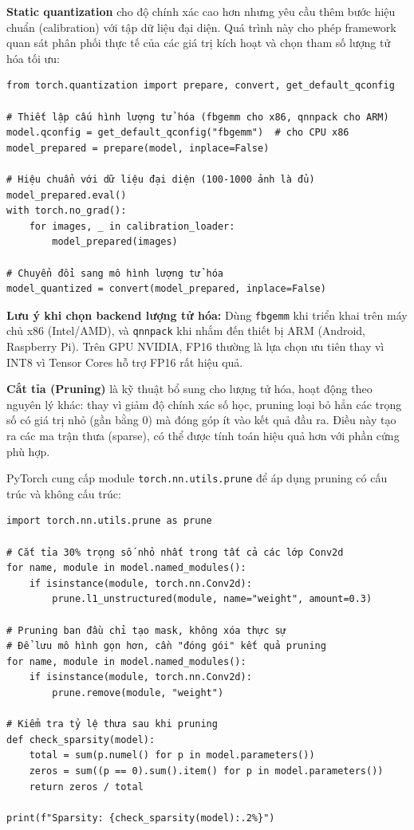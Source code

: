 \textbf{Static quantization} cho độ chính xác cao hơn nhưng yêu cầu thêm bước hiệu chuẩn (calibration) với tập dữ liệu đại diện. Quá trình này cho phép framework quan sát phân phối thực tế của các giá trị kích hoạt và chọn tham số lượng tử hóa tối ưu:

\begin{verbatim}
from torch.quantization import prepare, convert, get_default_qconfig

# Thiết lập cấu hình lượng tử hóa (fbgemm cho x86, qnnpack cho ARM)
model.qconfig = get_default_qconfig("fbgemm")  # cho CPU x86
model_prepared = prepare(model, inplace=False)

# Hiệu chuẩn với dữ liệu đại diện (100-1000 ảnh là đủ)
model_prepared.eval()
with torch.no_grad():
    for images, _ in calibration_loader:
        model_prepared(images)

# Chuyển đổi sang mô hình lượng tử hóa
model_quantized = convert(model_prepared, inplace=False)
\end{verbatim}

\begin{mdframed}[style=infobox]
\textbf{Lưu ý khi chọn backend lượng tử hóa:} Dùng \texttt{fbgemm} khi triển khai trên máy chủ x86 (Intel/AMD), và \texttt{qnnpack} khi nhắm đến thiết bị ARM (Android, Raspberry Pi). Trên GPU NVIDIA, FP16 thường là lựa chọn ưu tiên thay vì INT8 vì Tensor Cores hỗ trợ FP16 rất hiệu quả.
\end{mdframed}

\textbf{Cắt tỉa (Pruning)} là kỹ thuật bổ sung cho lượng tử hóa, hoạt động theo nguyên lý khác: thay vì giảm độ chính xác số học, pruning loại bỏ hẳn các trọng số có giá trị nhỏ (gần bằng 0) mà đóng góp ít vào kết quả đầu ra. Điều này tạo ra các ma trận thưa (sparse), có thể được tính toán hiệu quả hơn với phần cứng phù hợp.

PyTorch cung cấp module \texttt{torch.nn.utils.prune} để áp dụng pruning có cấu trúc và không cấu trúc:

\begin{verbatim}
import torch.nn.utils.prune as prune

# Cắt tỉa 30% trọng số nhỏ nhất trong tất cả các lớp Conv2d
for name, module in model.named_modules():
    if isinstance(module, torch.nn.Conv2d):
        prune.l1_unstructured(module, name="weight", amount=0.3)

# Pruning ban đầu chỉ tạo mask, không xóa thực sự
# Để lưu mô hình gọn hơn, cần "đóng gói" kết quả pruning
for name, module in model.named_modules():
    if isinstance(module, torch.nn.Conv2d):
        prune.remove(module, "weight")

# Kiểm tra tỷ lệ thưa sau khi pruning
def check_sparsity(model):
    total = sum(p.numel() for p in model.parameters())
    zeros = sum((p == 0).sum().item() for p in model.parameters())
    return zeros / total

print(f"Sparsity: {check_sparsity(model):.2%}")
\end{verbatim}

